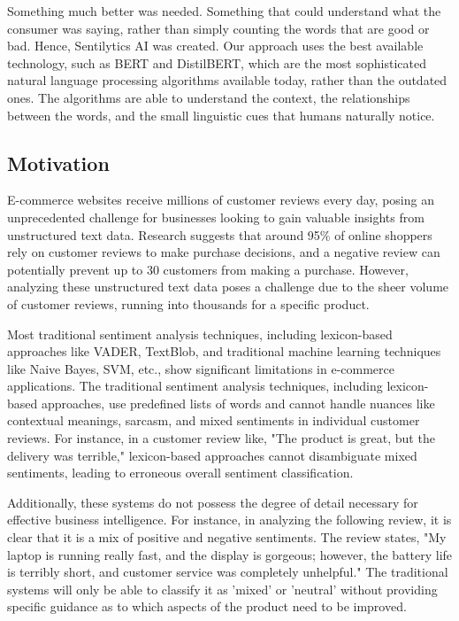\documentclass[11pt,a4paper]{article}
\begin{document}
Something much better was needed. Something that could understand what the consumer was saying, rather than simply counting the words that are good or bad. Hence, Sentilytics AI was created. Our approach uses the best available technology, such as BERT and DistilBERT, which are the most sophisticated natural language processing algorithms available today, rather than the outdated ones. The algorithms are able to understand the context, the relationships between the words, and the small linguistic cues that humans naturally notice.

\subsection{Motivation}

E-commerce websites receive millions of customer reviews every day, posing an unprecedented challenge for businesses looking to gain valuable insights from unstructured text data. Research suggests that around 95\% of online shoppers rely on customer reviews to make purchase decisions, and a negative review can potentially prevent up to 30 customers from making a purchase. However, analyzing these unstructured text data poses a challenge due to the sheer volume of customer reviews, running into thousands for a specific product.

Most traditional sentiment analysis techniques, including lexicon-based approaches like VADER, TextBlob, and traditional machine learning techniques like Naive Bayes, SVM, etc., show significant limitations in e-commerce applications. The traditional sentiment analysis techniques, including lexicon-based approaches, use predefined lists of words and cannot handle nuances like contextual meanings, sarcasm, and mixed sentiments in individual customer reviews. For instance, in a customer review like, "The product is great, but the delivery was terrible," lexicon-based approaches cannot disambiguate mixed sentiments, leading to erroneous overall sentiment classification.

Additionally, these systems do not possess the degree of detail necessary for effective business intelligence. For instance, in analyzing the following review, it is clear that it is a mix of positive and negative sentiments. The review states, "My laptop is running really fast, and the display is gorgeous; however, the battery life is terribly short, and customer service was completely unhelpful." The traditional systems will only be able to classify it as 'mixed' or 'neutral' without providing specific guidance as to which aspects of the product need to be improved.
\end{document}
